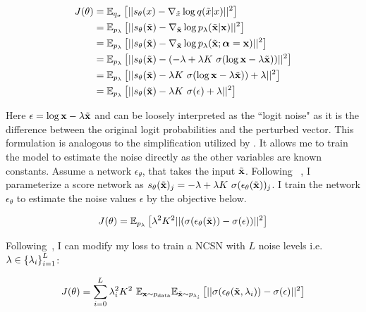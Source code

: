 \begin{align*}
\label{eq:cdsm}
    J(\theta) &= \mathbb{E}_{q_{\sigma}} \left[ { || s_\theta(x) - \nabla_{\Tilde{x}} \log q(\tilde{x} | x) ||^2 } \right]\\
     &= \mathbb{E}_{p_{\lambda}} \left[ { || s_\theta(\Tilde{\mathbf{x}}) - \nabla_{\Tilde{\mathbf{x}}} \log p_\lambda(\tilde{\mathbf{x}} | \mathbf{x}) ||^2 } \right] \\
     &= \mathbb{E}_{p_{\lambda}} \left[ { || s_\theta(\Tilde{\mathbf{x}}) - \nabla_{\Tilde{\mathbf{x}}} \log p_\lambda(\tilde{\mathbf{x}} ; \boldsymbol{\alpha} = \mathbf{x}) ||^2 } \right] \\
     &= \mathbb{E}_{p_{\lambda}} \left[ { || s_\theta(\Tilde{\mathbf{x}}) - (- \lambda + \lambda K~\sigma(\log \mathbf{x} - \lambda \Tilde{\mathbf{x}})) ||^2 } \right] \\
     &= \mathbb{E}_{p_{\lambda}} \left[ { || s_\theta(\Tilde{\mathbf{x}}) - \lambda K~\sigma(\log \mathbf{x} - \lambda \Tilde{\mathbf{x}}))  + \lambda ||^2 } \right] \\
     &= \mathbb{E}_{p_{\lambda}} \left[ { || s_\theta(\Tilde{\mathbf{x}}) - \lambda K~\sigma(\epsilon)  + \lambda ||^2 } \right]
\end{align*}

Here $\epsilon=\log \mathbf{x} - \lambda \Tilde{\mathbf{x}}$ and can be loosely interpreted as the ``logit noise" as it is the difference between the original logit probabilities and the perturbed vector. This formulation is analogous to the simplification utilized by \cite{song2020score,ho2020denoising}. It allows me to train the model to estimate the noise directly as the other variables are known constants. Assume a network $\epsilon_\theta$, that takes the input $\Tilde{\mathbf{x}}$. Following ~, I parameterize a score network as $s_\theta(\Tilde{\mathbf{x}})_j = - \lambda + \lambda K~\sigma(\epsilon_\theta(\Tilde{\mathbf{x}}))_j$. I train the network $\epsilon_\theta$ to estimate the noise values $\epsilon$ by the objective below.  

\begin{equation}
\label{eq:train_obj}
    J(\theta)  = \mathbb{E}_{p_{\lambda}} \left[ { \lambda^2 K^2 ||( \sigma( \epsilon_\theta(\Tilde{\mathbf{x}}) ) - \sigma(\epsilon) )||^2 } \right]
\end{equation}

Following~\cite{Song2019}, I can modify my loss to train a NCSN with $L$ noise levels i.e. $\lambda \in \left\{ {\lambda_i} \right\}_{i=1}^L$:

\begin{equation*}
    J(\theta)  = \sum_{i=0}^{L} \lambda_i^2 K^2 ~\mathbb{E}_{\mathbf{x} \sim p_{\text{data}}} \mathbb{E}_{\Tilde{\mathbf{x}} \sim p_{\lambda_i}} \left[ { || \sigma( \epsilon_\theta(\Tilde{\mathbf{x}}, \lambda_i) ) - \sigma(\epsilon) ||^2 } \right]
\end{equation*}


